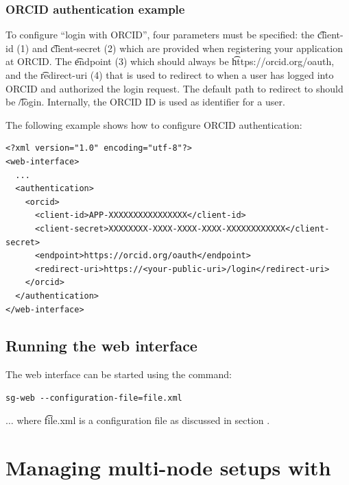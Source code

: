\subsubsection{ORCID authentication example}

  To configure ``login with ORCID'', four parameters must be specified:
  the \t{client-id} (1) and \t{client-secret} (2) which are provided
  when registering your application at ORCID.  The \t{endpoint} (3) which
  should always be \t{https://orcid.org/oauth}, and the \t{redirect-uri}
  (4) that is used to redirect to when a user has logged into ORCID and
  authorized the login request.  The default path to redirect to should
  be \t{/login}.  Internally, the ORCID ID is used as identifier for a user.

  The following example shows how to configure ORCID authentication:

\begin{siderules}
\begin{verbatim}
<?xml version="1.0" encoding="utf-8"?>
<web-interface>
  ...
  <authentication>
    <orcid>
      <client-id>APP-XXXXXXXXXXXXXXXX</client-id>
      <client-secret>XXXXXXXX-XXXX-XXXX-XXXX-XXXXXXXXXXXX</client-secret>
      <endpoint>https://orcid.org/oauth</endpoint>
      <redirect-uri>https://<your-public-uri>/login</redirect-uri>
    </orcid>
  </authentication>
</web-interface>
\end{verbatim}
\end{siderules}

\subsection{Running the web interface}

  The web interface can be started using the  command:

\begin{siderules}
\begin{verbatim}
sg-web --configuration-file=file.xml
\end{verbatim}
\end{siderules}

  $\ldots{}$ where \t{file.xml} is a configuration file as
  discussed in section .

\pagebreak{}
\section{Managing multi-node setups with }

